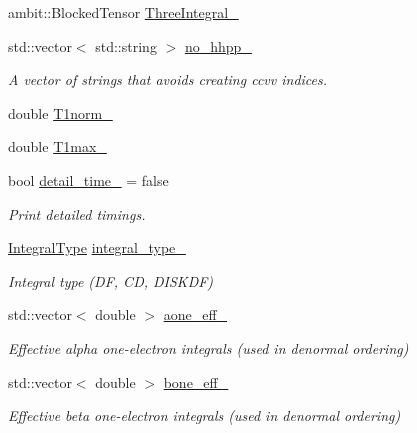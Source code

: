 \begin{DoxyCompactItemize}
\item 
ambit\+::\+Blocked\+Tensor \mbox{\hyperlink{classforte_1_1_t_h_r_e_e___d_s_r_g___m_r_p_t2_a0203412292c25068afa661d412e91c8c}{Three\+Integral\+\_\+}}
\item 
std\+::vector$<$ std\+::string $>$ \mbox{\hyperlink{classforte_1_1_t_h_r_e_e___d_s_r_g___m_r_p_t2_a3bdd9a833750b3922fab6edc812beacc}{no\+\_\+hhpp\+\_\+}}
\begin{DoxyCompactList}\small\item\em A vector of strings that avoids creating ccvv indices. \end{DoxyCompactList}\item 
double \mbox{\hyperlink{classforte_1_1_t_h_r_e_e___d_s_r_g___m_r_p_t2_a64f019f725e6ac20fc9c963ea856bc2a}{T1norm\+\_\+}}
\item 
double \mbox{\hyperlink{classforte_1_1_t_h_r_e_e___d_s_r_g___m_r_p_t2_a702090751bca8567701fbe9b23f42ead}{T1max\+\_\+}}
\item 
bool \mbox{\hyperlink{classforte_1_1_t_h_r_e_e___d_s_r_g___m_r_p_t2_a6b18fc54a722e1f3fbeb0e1793a20222}{detail\+\_\+time\+\_\+}} = false
\begin{DoxyCompactList}\small\item\em Print detailed timings. \end{DoxyCompactList}\item 
\mbox{\hyperlink{namespaceforte_a790e7e85ac0911c4c9494622496d95e6}{Integral\+Type}} \mbox{\hyperlink{classforte_1_1_t_h_r_e_e___d_s_r_g___m_r_p_t2_a9516064f0a4a66acd24b45301dbfcdc2}{integral\+\_\+type\+\_\+}}
\begin{DoxyCompactList}\small\item\em Integral type (DF, CD, D\+I\+S\+K\+DF) \end{DoxyCompactList}\item 
std\+::vector$<$ double $>$ \mbox{\hyperlink{classforte_1_1_t_h_r_e_e___d_s_r_g___m_r_p_t2_a09b36773a025e43e0eec7166cab8f2af}{aone\+\_\+eff\+\_\+}}
\begin{DoxyCompactList}\small\item\em Effective alpha one-\/electron integrals (used in denormal ordering) \end{DoxyCompactList}\item 
std\+::vector$<$ double $>$ \mbox{\hyperlink{classforte_1_1_t_h_r_e_e___d_s_r_g___m_r_p_t2_ab6f0a453a149c8a72b9aca34b0c80721}{bone\+\_\+eff\+\_\+}}
\begin{DoxyCompactList}\small\item\em Effective beta one-\/electron integrals (used in denormal ordering) \end{DoxyCompactList}\item 

\end{DoxyCompactItemize}

